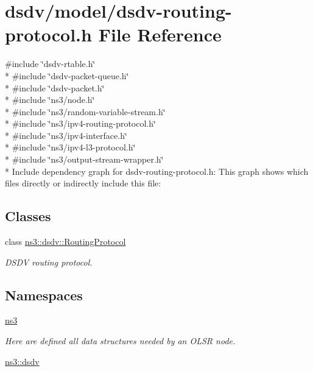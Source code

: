 \hypertarget{dsdv-routing-protocol_8h}{}\section{dsdv/model/dsdv-\/routing-\/protocol.h File Reference}
\label{dsdv-routing-protocol_8h}
{\ttfamily \#include \char`\"{}dsdv-\/rtable.\+h\char`\"{}}\\*
{\ttfamily \#include \char`\"{}dsdv-\/packet-\/queue.\+h\char`\"{}}\\*
{\ttfamily \#include \char`\"{}dsdv-\/packet.\+h\char`\"{}}\\*
{\ttfamily \#include \char`\"{}ns3/node.\+h\char`\"{}}\\*
{\ttfamily \#include \char`\"{}ns3/random-\/variable-\/stream.\+h\char`\"{}}\\*
{\ttfamily \#include \char`\"{}ns3/ipv4-\/routing-\/protocol.\+h\char`\"{}}\\*
{\ttfamily \#include \char`\"{}ns3/ipv4-\/interface.\+h\char`\"{}}\\*
{\ttfamily \#include \char`\"{}ns3/ipv4-\/l3-\/protocol.\+h\char`\"{}}\\*
{\ttfamily \#include \char`\"{}ns3/output-\/stream-\/wrapper.\+h\char`\"{}}\\*
Include dependency graph for dsdv-\/routing-\/protocol.h\+:
This graph shows which files directly or indirectly include this file\+:
\subsection*{Classes}
\begin{DoxyCompactItemize}
\item 
class \hyperlink{classns3_1_1dsdv_1_1RoutingProtocol}{ns3\+::dsdv\+::\+Routing\+Protocol}
\begin{DoxyCompactList}\small\item\em D\+S\+DV routing protocol. \end{DoxyCompactList}\end{DoxyCompactItemize}
\subsection*{Namespaces}
\begin{DoxyCompactItemize}
\item 
 \hyperlink{namespacens3}{ns3}
\begin{DoxyCompactList}\small\item\em Here are defined all data structures needed by an O\+L\+SR node. \end{DoxyCompactList}\item 
 \hyperlink{namespacens3_1_1dsdv}{ns3\+::dsdv}
\end{DoxyCompactItemize}
